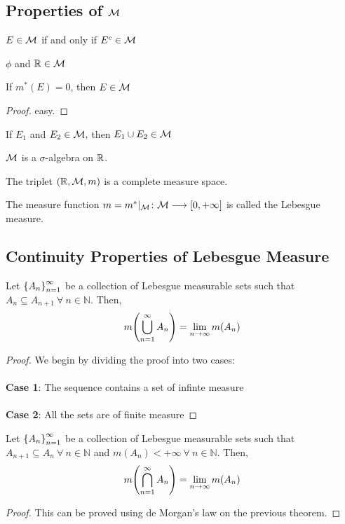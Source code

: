 \documentclass[a4paper]{book}
\begin{document}
\subsection{Properties of $\mathcal{M}$}
\begin{theorem}
$E \in \mathcal{M}$ if and only if $E^c \in \mathcal{M}$
\end{theorem}
\begin{theorem}
$\phi$ and $\mathbb{R} \in \mathcal{M}$ 
\end{theorem}
\begin{theorem}
If $m^*(E) = 0$, then $E \in \mathcal{M}$ 
\begin{proof}
easy.
\end{proof}
\end{theorem}
\begin{theorem}
If $E_1$ and $E_2 \in \mathcal{M},$ then $E_1 \cup E_2 \in \mathcal{M}$
\end{theorem}
\begin{theorem}
$\mathcal{M}$ is a $\sigma$-algebra on $\mathbb{R}$.
\end{theorem}
\begin{theorem}
The triplet $(\mathbb{R}, \mathcal{M}, m)$ is a complete measure space.
\end{theorem}
\begin{definition}
The measure function $m = m^*|_{\mathcal{M}}\colon \mathcal{M} \longrightarrow [0, +\infty]$ is called the Lebesgue measure.
\end{definition}
\subsection{Continuity Properties of Lebesgue Measure}
\begin{theorem}
Let $\qty{A_n}_{n=1}^\infty$ be a collection of Lebesgue measurable sets such that $A_n \subseteq A_{n+1}\ \forall\ n\in \mathbb{N}$. Then, \[m\qty(\bigcup_{n=1}^\infty A_n) = \lim_{n \to \infty} m(A_n)\]
\begin{proof} 
We begin by dividing the proof into two cases:\\\\
{\bf Case 1}: The sequence contains a set of infinte measure \\\\
{\bf Case 2}: All the sets are of finite measure
\end{proof}
\end{theorem}
\begin{theorem}
Let $\qty{A_n}_{n=1}^\infty$ be a collection of Lebesgue measurable sets such that $A_{n+1} \subseteq A_{n}\ \forall\ n\in \mathbb{N}$ and $m(A_n)<+\infty\ \forall\ n\in\mathbb{N}$. Then, \[m\qty(\bigcap_{n=1}^\infty A_n) = \lim_{n \to \infty} m(A_n)\]
\begin{proof} 
This can be proved using de Morgan's law on the previous theorem.
\end{proof}
\end{theorem}
\end{document}
